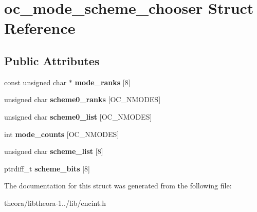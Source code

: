 \hypertarget{structoc__mode__scheme__chooser}{\section{oc\+\_\+mode\+\_\+scheme\+\_\+chooser Struct Reference}
\label{structoc__mode__scheme__chooser}
}
\subsection*{Public Attributes}
\begin{DoxyCompactItemize}
\item 
\hypertarget{structoc__mode__scheme__chooser_a85fa4d903b2ad071d3e1b7887c76f3b1}{const unsigned char $\ast$ {\bfseries mode\+\_\+ranks} \mbox{[}8\mbox{]}}\label{structoc__mode__scheme__chooser_a85fa4d903b2ad071d3e1b7887c76f3b1}

\item 
\hypertarget{structoc__mode__scheme__chooser_a8cf4ce70d0b89b7fcc0b112b246ef112}{unsigned char {\bfseries scheme0\+\_\+ranks} \mbox{[}O\+C\+\_\+\+N\+M\+O\+D\+E\+S\mbox{]}}\label{structoc__mode__scheme__chooser_a8cf4ce70d0b89b7fcc0b112b246ef112}

\item 
\hypertarget{structoc__mode__scheme__chooser_aba310adc59ef9109d68862c450d2ac15}{unsigned char {\bfseries scheme0\+\_\+list} \mbox{[}O\+C\+\_\+\+N\+M\+O\+D\+E\+S\mbox{]}}\label{structoc__mode__scheme__chooser_aba310adc59ef9109d68862c450d2ac15}

\item 
\hypertarget{structoc__mode__scheme__chooser_a5ad6d59738557336b1cbab831d776669}{int {\bfseries mode\+\_\+counts} \mbox{[}O\+C\+\_\+\+N\+M\+O\+D\+E\+S\mbox{]}}\label{structoc__mode__scheme__chooser_a5ad6d59738557336b1cbab831d776669}

\item 
\hypertarget{structoc__mode__scheme__chooser_a09723753a94aa652d7d7fd307fd58131}{unsigned char {\bfseries scheme\+\_\+list} \mbox{[}8\mbox{]}}\label{structoc__mode__scheme__chooser_a09723753a94aa652d7d7fd307fd58131}

\item 
\hypertarget{structoc__mode__scheme__chooser_a49177099aa7127514214dd6fdb39c34b}{ptrdiff\+\_\+t {\bfseries scheme\+\_\+bits} \mbox{[}8\mbox{]}}\label{structoc__mode__scheme__chooser_a49177099aa7127514214dd6fdb39c34b}

\end{DoxyCompactItemize}


The documentation for this struct was generated from the following file\+:\begin{DoxyCompactItemize}
\item 
theora/libtheora-\/1../lib/encint.\+h\end{DoxyCompactItemize}
